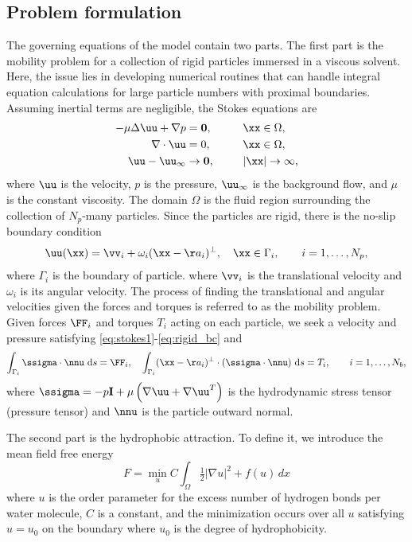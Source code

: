 \subsection{Problem formulation}
The governing equations of the model contain two parts.
The first part is the mobility problem for a collection of rigid particles
immersed in a viscous solvent. Here, the issue lies in developing 
numerical routines that can handle integral equation calculations for 
large particle numbers with proximal boundaries.  
Assuming inertial terms are negligible, the Stokes equations are
\begin{alignat}{3}
\label{eq:stokes1}
  -\mu \Delta \uu + \nabla p &= \mathbf{0}, 
    && \xx \in \Omega, \\
\label{eq:stokes2}
  \nabla\cdot \uu &= 0, \qquad && \xx \in \Omega, \\
\label{eq:stokes3}
  \uu - \uu_\infty &\to \mathbf{0}, && |\xx| \to \infty,
\end{alignat}
%
where $\uu$ is the velocity, $p$ is the
pressure, $\uu_\infty$ is the background flow, and $\mu$ is the constant viscosity. 
The domain $\Omega$ is the fluid region surrounding 
the collection of $N_p$-many particles. 
Since the particles are rigid, there is the no-slip boundary condition
\begin{align}
\label{eq:rigid_bc}
  \uu(\xx) = \vv_i + \omega_i  (\xx - \aa_i)^\perp, \quad
    \xx \in \Gamma_i,\qquad  i=1,\ldots,N_p,
\end{align}
where $\Gamma_i$ is the boundary of particle.
where $\vv_i$ is the translational velocity and $\omega_i$ is its
angular velocity. 
The process of finding the
translational and angular velocities given the forces and torques is
referred to as the mobility problem.
Given forces $\FF_i$ and torques $T_i$ acting on each
particle, we seek a velocity and pressure satisfying \eqref{eq:stokes1}-\eqref{eq:rigid_bc} 
and
\begin{equation}
  \label{eq:force}
  \int_{\Gamma_i} \ssigma \cdot \nnu \, \dif s = \FF_i,\quad 
  \int_{\Gamma_i} (\xx - \aa_i)^{\perp} \cdot (\ssigma \cdot \nnu) \, \dif s = T_i, \qquad i=1,\ldots,N_b,
\end{equation}
where $\ssigma = -p \mathbf{I} + \mu \left(\nabla \uu + \nabla \uu^T
\right)$ is the hydrodynamic stress tensor (pressure tensor) and
$\nnu$ is the particle outward normal. 

The second part is the hydrophobic 
attraction.  To define it, we introduce 
the mean field free energy
\begin{equation}
\label{eq:free_energy}
F = \min_u C \int_{\Omega}  \tfrac{1}{2} |\nabla u|^2 + f(u) \,dx
\end{equation}
where $u$ is the order parameter for the excess number of hydrogen
bonds per water molecule, $C$ is a constant, and the minimization 
occurs over all $u$ satisfying $u = u_0$ on the boundary where $u_0$
is the degree of hydrophobicity.  

